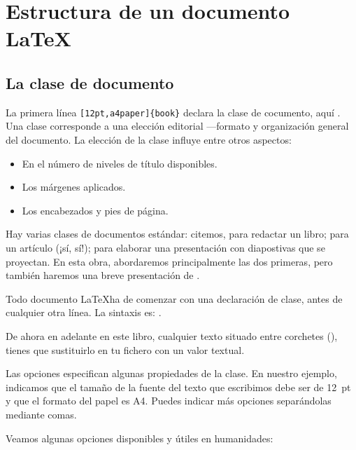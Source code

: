 \section{Estructura de un documento \LaTeX}

\subsection{La clase de documento}
La primera línea \verb|[12pt,a4paper]{book}| declara la clase de cocumento, aquí . Una clase corresponde a una elección editorial ---formato y organización general del documento. La elección de la clase influye entre otros aspectos:
\begin{itemize}
\item En el número de niveles de título disponibles.
\item Los márgenes aplicados.
\item Los encabezados y pies de página.
\end{itemize}

Hay varias clases de documentos estándar: citemos, para redactar un libro;  para un artículo (¡sí, sí!);  para elaborar una presentación con diapostivas que se proyectan. En esta obra, abordaremos principalmente las dos primeras, pero también haremos una breve presentación de  .


Todo documento \LaTeX  ha de comenzar con una declaración de clase, antes de cualquier otra línea.
La sintaxis es: 
.

\begin{attention}
De ahora en adelante en este libro, cualquier texto situado entre corchetes (), tienes que sustituirlo en tu fichero  con un valor textual.
\end{attention}

Las opciones especifican algunas propiedades de la clase. En nuestro ejemplo, indicamos que el tamaño de la fuente del texto que escribimos debe ser de 12~pt y que el formato del papel es A4. Puedes indicar más opciones separándolas mediante comas.

\label{optionsclasse}

Veamos algunas opciones disponibles y útiles en humanidades:

